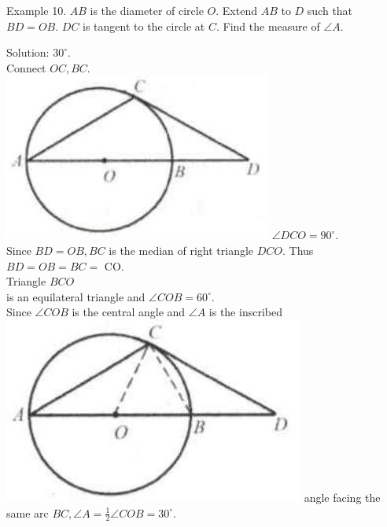 \documentclass[10pt]{article}
\begin{document}
Example 10. \(A B\) is the diameter of circle \(O\). Extend \(A B\) to \(D\) such that \(B D=O B\). \(D C\) is tangent to the circle at \(C\). Find the measure of \(\angle A\).

Solution: \(30^{\circ}\).\\
Connect \(O C, B C\).\\
\includegraphics[max width=\textwidth]{2025_04_17_97bc1f7e44d93c271a88g-151(4)} \(\angle D C O=90^{\circ}\).\\
Since \(B D=O B, B C\) is the median of right triangle \(D C O\). Thus \(B D=O B=B C=\) CO.\\
Triangle \(B C O\)\\
is an equilateral triangle and \(\angle C O B=60^{\circ}\).\\
Since \(\angle C O B\) is the central angle and \(\angle A\) is the inscribed\\
\includegraphics[max width=\textwidth]{2025_04_17_97bc1f7e44d93c271a88g-151} angle facing the same arc \(B C, \angle A=\frac{1}{2} \angle C O B=30^{\circ}\).
\end{document}
